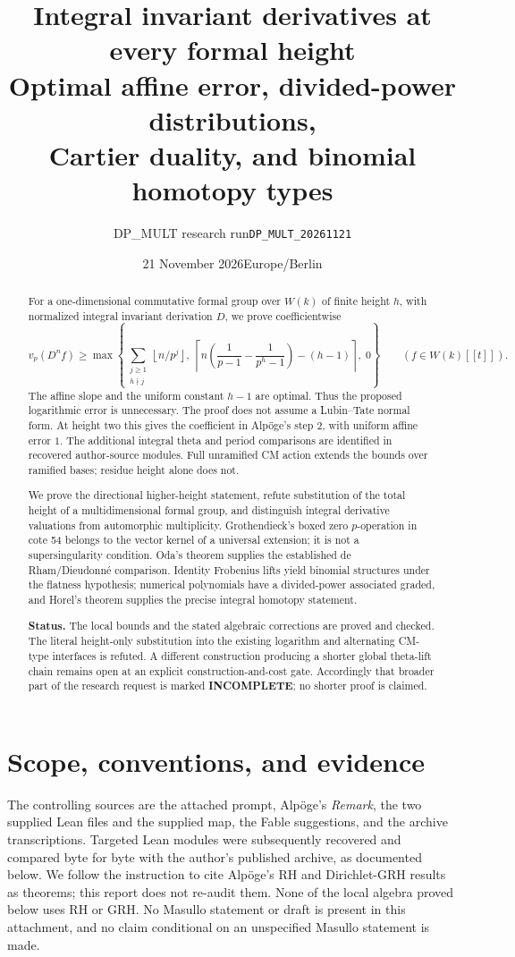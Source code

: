 \documentclass[11pt,a4paper]{article}
\title{Integral invariant derivatives at every formal height\\
\large Optimal affine error, divided-power distributions,\\Cartier duality, and binomial homotopy types}
\author{DP\_MULT research run\quad\texttt{DP\_MULT\_20261121}}
\date{21 November 2026\quad Europe/Berlin}
\theoremstyle{definition}\newtheorem{remark}[theorem]{Remark}
\newcommand{\vp}{v_p}\newcommand{\dR}{\mathrm{dR}}\newcommand{\crys}{\mathrm{crys}}
\newcommand{\ceil}[1]{\left\lceil #1\right\rceil}\newcommand{\floor}[1]{\left\lfloor #1\right\rfloor}
\begin{document}
\maketitle
\begin{abstract}
For a one-dimensional commutative formal group over $W(k)$ of finite height $h$, with normalized integral invariant derivation $D$, we prove coefficientwise
\[
 \vp(D^n f)\ge
 \max\left\{\sum_{\substack{j\ge1\\h\nmid j}}\floor{n/p^j},\;
 \ceil{n\left(\frac1{p-1}-\frac1{p^h-1}\right)-(h-1)},\;0\right\}
 \qquad(f\in W(k)[[t]]).
\]
The affine slope and the uniform constant $h-1$ are optimal. Thus the proposed logarithmic error is unnecessary. The proof does not assume a Lubin--Tate normal form. At height two this gives the coefficient in Alp\"oge's step 2, with uniform affine error $1$. The additional integral theta and period comparisons are identified in recovered author-source modules. Full unramified CM action extends the bounds over ramified bases; residue height alone does not.

We prove the directional higher-height statement, refute substitution of the total height of a multidimensional formal group, and distinguish integral derivative valuations from automorphic multiplicity. Grothendieck's boxed zero $p$-operation in cote 54 belongs to the vector kernel of a universal extension; it is not a supersingularity condition. Oda's theorem supplies the established de Rham/Dieudonn\'e comparison. Identity Frobenius lifts yield binomial structures under the flatness hypothesis; numerical polynomials have a divided-power associated graded, and Horel's theorem supplies the precise integral homotopy statement.

\textbf{Status.} The local bounds and the stated algebraic corrections are proved and checked. The literal height-only substitution into the existing logarithm and alternating CM-type interfaces is refuted. A different construction producing a shorter global theta-lift chain remains open at an explicit construction-and-cost gate. Accordingly that broader part of the research request is marked \textbf{INCOMPLETE}; no shorter proof is claimed.
\end{abstract}
\tableofcontents
\newpage

\section{Scope, conventions, and evidence}

The controlling sources are the attached prompt, Alp\"oge's \emph{Remark}, the two supplied Lean files and the supplied map, the Fable suggestions, and the archive transcriptions. Targeted Lean modules were subsequently recovered and compared byte for byte with the author's published archive, as documented below. We follow the instruction to cite Alp\"oge's RH and Dirichlet-GRH results as theorems; this report does not re-audit them. None of the local algebra proved below uses RH or GRH. No Masullo statement or draft is present in this attachment, and no claim conditional on an unspecified Masullo statement is made.
\end{document}
